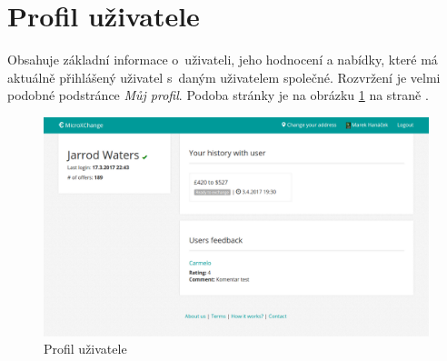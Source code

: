 \section{Profil uživatele}

\label{nur:user-profile}

Obsahuje základní informace o~uživateli, jeho hodnocení a nabídky, které má aktuálně přihlášený uživatel s~daným uživatelem společné. Rozvržení je velmi podobné podstránce \textit{Můj profil}. Podoba stránky je na obrázku \ref{fig:tur:user-profile} na straně \pageref{fig:tur:user-profile}.

\begin{figure}[!h]
    \centering
    \includegraphics[width=1.0\textwidth]{media/tur/user-profile.png}
    \caption{Profil uživatele}
    \label{fig:tur:user-profile}
\end{figure}